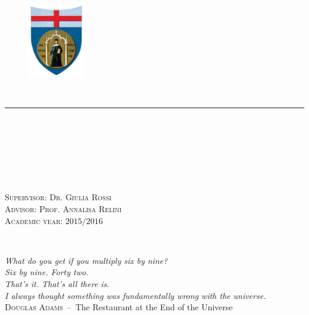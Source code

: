 \documentclass[a4paper,11pt,cleardoubleempty,bibliography=totoc]{scrbook}
\numberwithin{equation}{section}
\begin{document}
\frontmatter
\pagestyle{scrheadings}
\clearscrheadfoot
\rohead{\pagemark}
\lehead{\pagemark\qquad\leftmark}

%
\begin{titlepage}
\begin{center}
	\begin{figure}[h!t]
		\center
		\includegraphics[width=0.22\textwidth]{./unige.png}
	\end{figure}
	\\
	\noindent\rule{\textwidth}{0.5pt}\\
	\\
	~\\[3cm]
	\begin{doublespacing}
    	{\textcolor{BrickRed}{\large{}}\par}%
	\end{doublespacing}
	~\\[3cm]
     \\
\end{center}
\vfill
\begin{doublespacing}
	\noindent%
	\textsc{\sffamily Supervisor: Dr. Giulia Rossi}\\%
	\textsc{\sffamily Advisor: Prof. Annalisa Relini}\\%
	\textsc{\sffamily Academic year: $2015/2016$}\par
\end{doublespacing}
\end{titlepage}
\restoregeometry

\cleardoublepage
~\\[3cm]
\begin{flushright}\footnotesize
	\textsl{What do you get if you multiply six by nine?}\\
	\textsl{Six by nine. Forty two.}\\
	\textsl{That's it. That's all there is.}\\
	\textsl{I always thought something was fundamentally wrong with the universe.}\\\medskip
	\footnotesize\textsc{\sffamily Douglas Adams}\ --\ \textsf{The Restaurant at the End of the Universe}
\end{flushright}
\vfill
\end{document}
